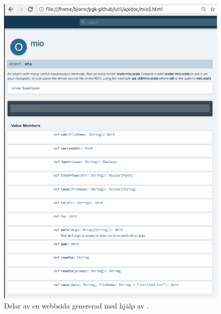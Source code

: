 \begin{figure}[t]
\includegraphics[width=1.0\textwidth]{../img/scaladoc/scaladoc-mio}
    \caption{Delar av en webbsida genererad med hjälp av \scaladoc. %
    }
    \label{fig:scaladoc:webpage}
\end{figure}



